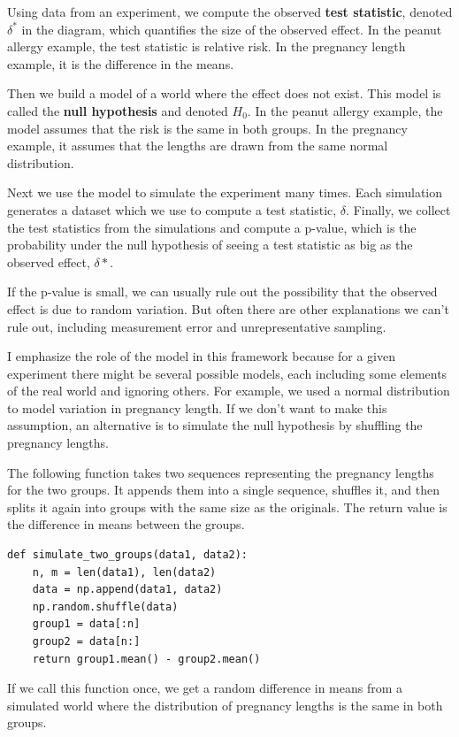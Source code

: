 Using data from an experiment, we compute the observed \textbf{test
statistic}, denoted \(\delta^*\) in the diagram, which quantifies the
size of the observed effect. In the peanut allergy example, the test
statistic is relative risk. In the pregnancy length example, it is the
difference in the means.

Then we build a model of a world where the effect does not exist. This
model is called the \textbf{null hypothesis} and denoted \(H_0\). In the
peanut allergy example, the model assumes that the risk is the same in
both groups. In the pregnancy example, it assumes that the lengths are
drawn from the same normal distribution.

Next we use the model to simulate the experiment many times. Each
simulation generates a dataset which we use to compute a test statistic,
\(\delta\). Finally, we collect the test statistics from the simulations
and compute a p-value, which is the probability under the null
hypothesis of seeing a test statistic as big as the observed effect,
\(\delta*\).

If the p-value is small, we can usually rule out the possibility that
the observed effect is due to random variation. But often there are
other explanations we can't rule out, including measurement error and
unrepresentative sampling.

I emphasize the role of the model in this framework because for a given
experiment there might be several possible models, each including some
elements of the real world and ignoring others. For example, we used a
normal distribution to model variation in pregnancy length. If we don't
want to make this assumption, an alternative is to simulate the null
hypothesis by shuffling the pregnancy lengths.

The following function takes two sequences representing the pregnancy
lengths for the two groups. It appends them into a single sequence,
shuffles it, and then splits it again into groups with the same size as
the originals. The return value is the difference in means between the
groups.

\begin{lstlisting}[]
def simulate_two_groups(data1, data2):
    n, m = len(data1), len(data2)
    data = np.append(data1, data2)
    np.random.shuffle(data)
    group1 = data[:n]
    group2 = data[n:]
    return group1.mean() - group2.mean()
\end{lstlisting}

If we call this function once, we get a random difference in means from
a simulated world where the distribution of pregnancy lengths is the
same in both groups.

